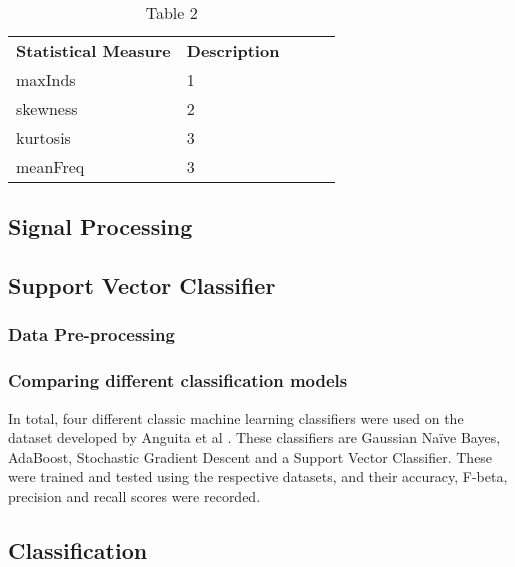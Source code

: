     \begin{table}[]
    \begin{tabular}{|l|l|lll}
    \cline{1-2}
    \textbf{Statistical Measure} & \textbf{Description} &  &  &  \\ \cline{1-2}
    maxInds             & 1           &  &  &  \\ \cline{1-2}
    skewness            & 2           &  &  &  \\ \cline{1-2}
    kurtosis               & 3           &  &  &  \\ \cline{1-2}
    meanFreq            & 3           &  &  &  \\ \cline{1-2}
    \end{tabular}
    \caption{Table 2}
    \label{tab:table-2}
    \end{table}


\subsection{Signal Processing}

\subsection{Support Vector Classifier}
    \subsubsection{Data Pre-processing}
        

    \subsubsection{Comparing different classification models}
        In total, four different classic machine learning classifiers were used on the dataset developed by Anguita et al \cite{Anguita2012}. These classifiers are Gaussian Naïve Bayes,
        AdaBoost, Stochastic Gradient Descent and a Support Vector Classifier. These were trained and tested using the respective datasets, and their accuracy,
        F-beta, precision and recall scores were recorded.

    \subsection{Classification}